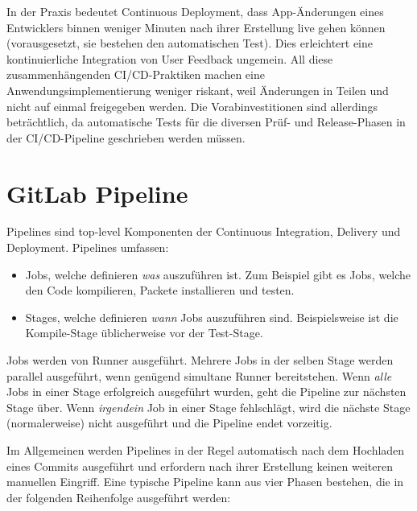In der Praxis bedeutet Continuous Deployment, dass App-Änderungen eines Entwicklers binnen weniger Minuten nach ihrer Erstellung live gehen können (vorausgesetzt, sie bestehen den automatischen Test). Dies erleichtert eine kontinuierliche Integration von User Feedback ungemein. All diese zusammenhängenden CI/CD-Praktiken machen eine Anwendungsimplementierung weniger riskant, weil Änderungen in Teilen und nicht auf einmal freigegeben werden. Die Vorabinvestitionen sind allerdings beträchtlich, da automatische Tests für die diversen Prüf- und Release-Phasen in der CI/CD-Pipeline geschrieben werden müssen.\autocite{whatIsCICD}

\section{GitLab Pipeline}

Pipelines sind top-level Komponenten der Continuous Integration, Delivery und Deployment. Pipelines umfassen:\autocite{gitlabPipelines}

\begin{itemize}
	\item Jobs, welche definieren \textit{was} auszuführen ist. Zum Beispiel gibt es Jobs, welche den Code kompilieren, Packete installieren und testen.
	\item Stages, welche definieren \textit{wann} Jobs auszuführen sind. Beispielsweise ist die Kompile-Stage üblicherweise vor der Test-Stage.
\end{itemize}

Jobs werden von Runner ausgeführt. Mehrere Jobs in der selben Stage werden parallel ausgeführt, wenn genügend simultane Runner bereitstehen.
Wenn \textit{alle} Jobs in einer Stage erfolgreich ausgeführt wurden, geht die Pipeline zur nächsten Stage über.
Wenn \textit{irgendein} Job in einer Stage fehlschlägt, wird die nächste Stage (normalerweise) nicht ausgeführt und die Pipeline endet vorzeitig.\autocite{gitlabPipelines}

\newpage

Im Allgemeinen werden Pipelines in der Regel automatisch  nach dem Hochladen eines Commits ausgeführt und erfordern nach ihrer Erstellung keinen weiteren manuellen Eingriff.
Eine typische Pipeline kann aus vier Phasen bestehen, die in der folgenden Reihenfolge ausgeführt werden:\autocite{gitlabPipelines}

